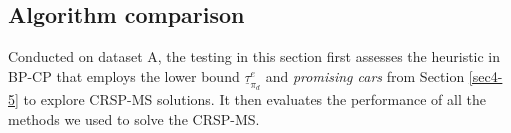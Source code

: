 \documentclass[12pt]{article}
\begin{document}



\subsection{Algorithm comparison}\label{sec5-2}
Conducted on dataset A, the testing in this section first assesses the heuristic in BP-CP that employs the lower bound $\underline{\tau}^e_{\pi_d}$ and \textit{promising cars} from Section \ref{sec4-5} to explore CRSP-MS solutions. It then evaluates the performance of all the methods we used to solve the CRSP-MS.







\end{document}
